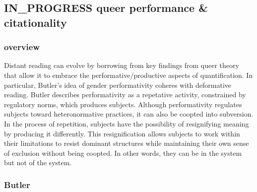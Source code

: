 \documentclass[11pt]{article}
\begin{document}
\subsection{{\bfseries\sffamily IN\_PROGRESS} queer performance \& citationality}
\label{sec:org4252835}
\subsubsection{overview}
\label{sec:orgdaefe70}
Distant reading can evolve by borrowing from key findings from queer
theory that allow it to embrace the performative/productive aspects of
quantification. In particular, Butler's idea of gender performativity
coheres with deformative reading. Butler describes performativity as a
repetative activity, constrained by regulatory norms, which produces
subjects. Although performativity regulates subjects toward
heteronormative practices, it can also be coopted into subversion. In
the process of repetition, subjects have the possibility of
resignifying meaning by producing it differently. This resignification
allows subjects to work within their limitations to resist dominant
structures while maintaining their own sense of exclusion without
being coopted. In other words, they can be in the system but not of
the system.

\subsubsection{Butler}
\label{sec:orgf7a29f2}
\end{document}
